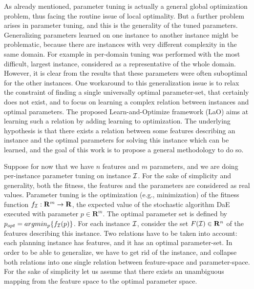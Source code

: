 \documentclass[runningheads,a4paper]{llncs}
\begin{document}
As already mentioned, parameter tuning is actually a general global optimization problem, thus facing the routine issue of local optimality. But a further problem arises in parameter tuning, and this is the generality of the tuned parameters. Generalizing parameters learned on one instance to another instance might be problematic, because there are instances with very different complexity in the same domain. For example in \cite{BibGECCO:2010} per-domain tuning was performed with the most difficult, largest instance, considered as a representative of the whole domain. However, it is clear from the results that these parameters were often suboptimal for the other instances. One workaround to this generalization issue is to relax the constraint of finding a single universally optimal parameter-set, that certainly does not exist, and to focus on learning a complex relation between instances and optimal parameters. The proposed Learn-and-Optimize framework (LaO) aims at learning such a relation by adding learning to optimization. The underlying hypothesis is that there exists a relation between some features describing an instance and the optimal parameters for solving this instance which can be learned, and the goal of this work is to propose a general methodology to do so. 

Suppose for now that we have $n$ features and $m$ parameters, and we are doing per-instance parameter tuning on instance $\cal I$. For the sake of simplicity and generality, both the fitness, the features and the parameters are considered as real values. Parameter tuning is the optimization (e.g., minimization) of the fitness function \begin{math}f_{\cal I}:\mathbf{R}^m\to \mathbf{R} \end{math}, the expected value of the stochastic algorithm DaE executed with parameter \begin{math} p \in \mathbf{R}^m \end{math}. The optimal parameter set is defined by \begin{math} p_{opt}=argmin_p\{f_{\cal I}(p)\} \end{math}. For each instance $\cal I$, consider the set \begin{math} F({\cal I}) \in \mathbf{R}^n \end{math} of the features describing this instance. 
Two relations have to be taken into account: each planning instance has features, and it has an optimal parameter-set. In order to be able to generalize, we have to get rid of the instance, and collapse both relations into one single relation between feature-space and parameter-space. For the sake of simplicity let us assume that there exists an unambiguous mapping from the feature space to the optimal parameter space. 
\end{document}
